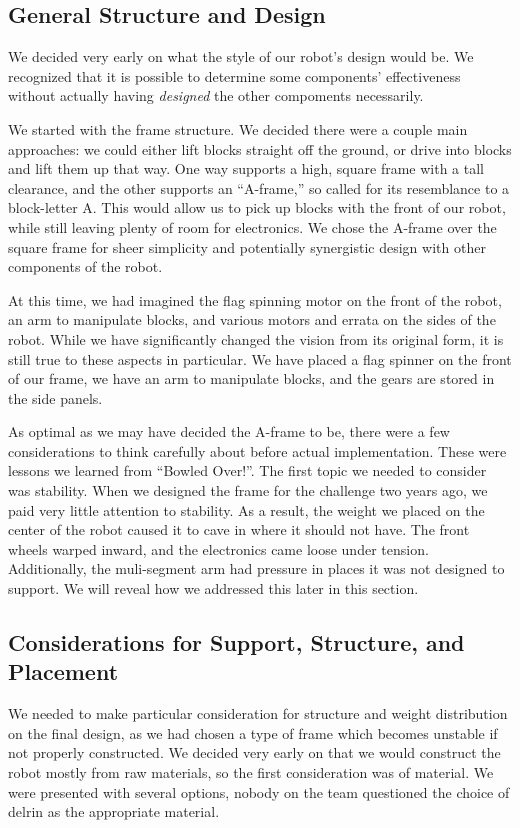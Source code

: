 \subsection{General Structure and Design}
We decided very early on what the style of our robot's design would be. We recognized that it is possible to determine some components' effectiveness without actually having \textit{designed} the other compoments necessarily. 

We started with the frame structure. We decided there were a couple main approaches: we could either lift blocks straight off the ground, or drive into blocks and lift them up that way. One way supports a high, square frame with a tall clearance, and the other supports an ``A-frame,'' so called for its resemblance to a block-letter A. This would allow us to pick up blocks with the front of our robot, while still leaving plenty of room for electronics. We chose the A-frame over the square frame for sheer simplicity and potentially synergistic design with other components of the robot. 

At this time, we had imagined the flag spinning motor on the front of the robot, an arm to manipulate blocks, and various motors and errata on the sides of the robot. While we have significantly changed the vision from its original form, it is still true to these aspects in particular. We have placed a flag spinner on the front of our frame, we have an arm to manipulate blocks, and the gears are stored in the side panels. 

As optimal as we may have decided the A-frame to be, there were a few considerations to think carefully about before actual implementation. These were lessons we learned from ``Bowled Over!''. The first topic we needed to consider was stability. When we designed the frame for the challenge two years ago, we paid very little attention to stability. As a result, the weight we placed on the center of the robot caused it to cave in where it should not have. The front wheels warped inward, and the electronics came loose under tension. Additionally, the muli-segment arm had pressure in places it was not designed to support. We will reveal how we addressed this later in this section.

\subsection{Considerations for Support, Structure, and Placement}
We needed to make particular consideration for structure and weight distribution on the final design, as we had chosen a type of frame which becomes unstable if not properly constructed. We decided very early on that we would construct the robot mostly from raw materials, so the first consideration was of material. We were presented with several options, nobody on the team questioned the choice of delrin as the appropriate material.

